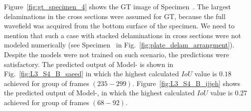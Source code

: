 Figure~\ref{fig:gt_specimen_4} shows the GT image of Specimen~.
The largest delaminations in the cross sections were assumed for GT, because the full wavefield was acquired from the bottom surface of the specimen.
We need to mention that such a case with stacked delaminations in cross sections were not modeled numerically (see Specimen~ in Fig.~\ref{fig:plate_delam_arrangment}).
Despite the models were not trained on such scenario, the predictions were satisfactory.
The predicted output of Model- is shown in Fig.~\ref{fig:L3_S4_B_saeed} in which the highest calculated \(IoU\) value is \(0.18\) achieved for group of frames \((235-299)\).
Figure~\ref{fig:L3_S4_B_ijjeh} shows the predicted output of Model-, in which the highest calculated \(IoU\) value is \(0.27\) achieved for group of frames \((68-92)\).

